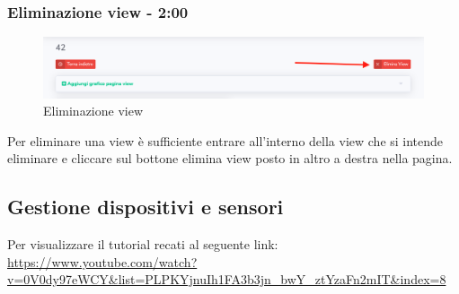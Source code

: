 	\subsubsection{Eliminazione view - 2:00}
		\begin{figure}[H]
		\centering
		\includegraphics[scale=0.600]{res/images/membro/eliminazView.png}
		\caption{Eliminazione view}
		\end{figure}
		Per eliminare una view è sufficiente entrare all'interno della view che si intende eliminare e cliccare sul bottone elimina view posto in altro a destra nella pagina.
	

\subsection{Gestione dispositivi e sensori}
Per visualizzare il tutorial recati al seguente link: 
\url{https://www.youtube.com/watch?v=0V0dy97eWCY&list=PLPKYjnuIh1FA3b3jn_bwY_ztYzaFn2mIT&index=8}

